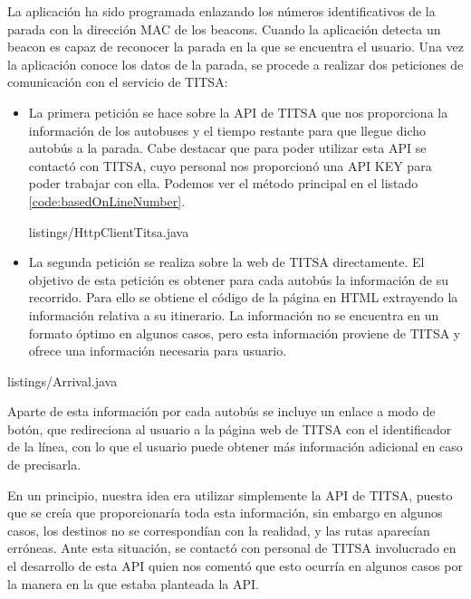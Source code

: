 La aplicación ha sido programada enlazando los números identificativos de la parada con la dirección MAC de los beacons. Cuando la aplicación detecta un beacon es capaz de reconocer la parada en la que se encuentra el usuario. Una vez la aplicación conoce los datos de la parada, se procede a realizar dos peticiones de comunicación con el servicio de TITSA: 


\begin{itemize}
\item La primera petición se hace sobre la API de TITSA que nos proporciona la información de los autobuses y el tiempo restante para que llegue dicho autobús a la parada. Cabe destacar que para poder utilizar esta API se contactó con TITSA, cuyo personal nos proporcionó una API KEY para poder trabajar con ella. Podemos ver el método principal en el listado \ref{code:basedOnLineNumber}.

\vspace{5mm}

{listings/HttpClientTitsa.java} %
\vspace{5mm}

\item La segunda petición se realiza sobre la web de TITSA directamente. El objetivo de esta petición es obtener para cada autobús la información de su recorrido. Para ello se obtiene el código de la página en HTML extrayendo la información relativa a su itinerario. La información no se encuentra en un formato óptimo en algunos casos, pero esta información proviene de TITSA y ofrece una información necesaria para usuario. 
\end{itemize}


{listings/Arrival.java} %

Aparte de esta información por cada autobús se incluye un enlace a modo de botón, que redireciona al usuario a la página web de TITSA con el identificador de la línea, con lo que el usuario puede obtener más información adicional en caso de precisarla.


En un principio, nuestra idea era utilizar simplemente la API de TITSA, puesto que se creía que proporcionaría toda esta información, sin embargo en algunos casos, los destinos no se correspondían con la realidad, y las rutas aparecían erróneas. Ante esta situación, se contactó con personal de  TITSA involucrado en el desarrollo de esta API quien nos comentó que esto ocurría en algunos casos por la manera en la que estaba planteada la API.


